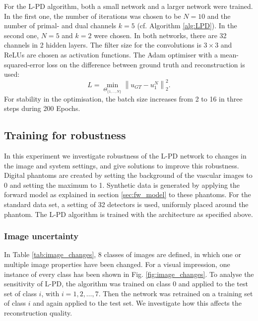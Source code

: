 \documentclass[journal]{IEEEtran}
\newcommand{\norm}[1]{\left\lVert#1\right\rVert}
\begin{document}
For the L-PD algorithm, both a small network and a larger network were trained. In the first one, the number of iterations was chosen to be $N=10$ and the number of primal- and dual channels $k=5$ (cf. Algorithm \ref{alg:LPD}). In the second one, $N=5$ and $k=2$ were chosen. In both networks, there are 32 channels in 2 hidden layers. The filter size for the convolutions is $3\times3$ and ReLUs are chosen as activation functions. The Adam optimiser \cite{Kingma2015} with a mean-squared-error loss on the difference between ground truth and reconstruction is used: 
\begin{equation}\label{eq:Loss_1}
L=\min_{\Theta_{\{1,\dots,N\}}}\norm{u_{GT}-u_1^N}^2_2.
\end{equation}
For stability in the optimisation, the batch size increases from 2 to 16 in three steps \cite{Smith2017} during 200 Epochs.

\subsection{Training for robustness}\label{sec:robustness}
In this experiment we investigate robustness of the L-PD network to changes in the image and system settings, and give solutions to improve this robustness. Digital phantoms are created by setting the background of the vascular images to 0 and setting the maximum to 1. Synthetic data is generated by applying the forward model as explained in section \ref{sec:fw_model} to these phantoms. For the standard data set, a setting of 32 detectors is used, uniformly placed around the phantom. The L-PD algorithm is trained with the architecture as specified above. 

\subsubsection{Image uncertainty}
In Table \ref{tab:image_changes}, 8 classes of images are defined, in which one or multiple image properties have been changed. For a visual impression, one instance of every class has been shown in Fig. \ref{fig:image_changes}. To analyse the sensitivity of L-PD, the algorithm was trained on class 0 and applied to the test set of class $i$, with $i=1,2,\dots,7$. Then the network was retrained on a training set of class $i$ and again applied to the test set. We investigate how this affects the reconstruction quality. 
\end{document}
